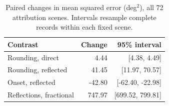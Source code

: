 \begin{table}[t]\centering\footnotesize
\caption{Paired changes in mean squared error (deg$^2$), all 72 attribution scenes. Intervals resample complete records within each fixed scene.}
\label{tab:effects}
\begin{tabular}{@{}lrr@{}}\toprule
Contrast & Change & 95\% interval\\\midrule
Rounding, direct & 4.44 & [4.38, 4.49]\\
Rounding, reflected & 41.45 & [11.97, 70.57]\\
Onset, reflected & -42.80 & [-62.40, -22.98]\\
Reflections, fractional & 747.97 & [699.52, 799.81]\\
\bottomrule\end{tabular}\end{table}

